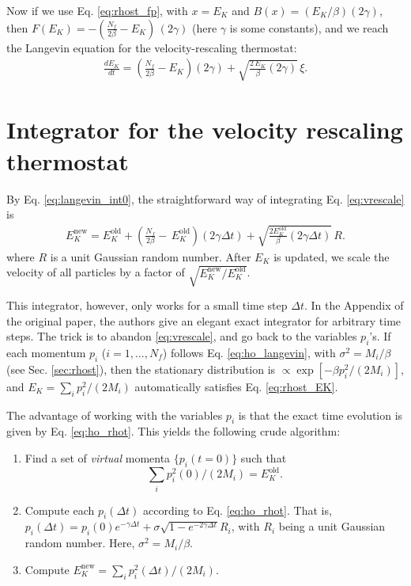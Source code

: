 \documentclass[11pt]{article}
\begin{document}
Now if we use Eq. \eqref{eq:rhost_fp},
with $x = E_K$ and $B(x) = (E_K/\beta) (2 \gamma)$,
then $F(E_K) = -\left(\frac { N_f } { 2 \beta } - E_K\right) \, (2 \gamma)$
(here $\gamma$ is some constants),
and we reach the Langevin equation
for the velocity-rescaling thermostat:
\begin{align}
\frac { d E_K } { d t }
=
  \left( \frac{ N_f }{ 2 \beta } - E_K \right)
  (2 \gamma)
+ \sqrt{ \frac{ 2 \, E_K } { \beta } ( 2 \gamma ) } \, \xi.
\label{eq:vrescale}
\end{align}




\section{Integrator for the velocity rescaling thermostat}



By Eq. \eqref{eq:langevin_int0},
the straightforward way of integrating Eq. \eqref{eq:vrescale} is
\begin{align}
E_K^\mathrm{new}
=
E_K^\mathrm{old}
+ \left( \frac{ N_f }{ 2 \beta } - \, E_K^\mathrm{old} \right)
  (2 \gamma \Delta t)
  + \sqrt{ \frac{ 2 E_K^\mathrm{old} } { \beta } (2 \gamma \Delta t) } \, R.
\label{eq:vrescale_int0}
\end{align}
%
where $R$ is a unit Gaussian random number.
After $E_K$ is updated,
we scale the velocity of all particles by a factor of
$\sqrt{ E_K^\mathrm{new} / E_K^\mathrm{old} }$.


This integrator, however,
only works for a small time step $\Delta t$.
%
In the Appendix of the original paper\cite{bdp2007},
the authors give an elegant exact integrator
for arbitrary time steps.
%
The trick is
to abandon \eqref{eq:vrescale},
and go back to the variables $p_i$'s.
%
If each momentum $p_i$ ($i = 1, \dots, N_f$) follows Eq. \eqref{eq:ho_langevin},
with $\sigma^2 = M_i/\beta$ (see Sec. \ref{sec:rhost}),
then the stationary distribution is
$\propto \exp[-\beta p_i^2/(2 M_i)]$,
and $E_K = \sum_i p_i^2 /(2 M_i)$
automatically satisfies Eq. \eqref{eq:rhost_EK}.

The advantage of working with the variables $p_i$
is that the exact time evolution
is given by Eq. \eqref{eq:ho_rhot}.
%
This yields the following crude algorithm:
%
\begin{enumerate}
  \item
    Find a set of \emph{virtual} momenta $\{ p_i(t = 0) \}$ such that
    \begin{equation}
      \sum_i p_i^2(0)/(2 M_i) = E_K^\mathrm{old}.
      \label{eq:sumEKold}
    \end{equation}

  \item
    Compute each $p_i(\Delta t)$ according to Eq. \eqref{eq:ho_rhot}.
    That is,
    $p_i(\Delta t) = p_i(0) e^{-\gamma \Delta t}
    + \sigma \sqrt{1 - e^{-2\gamma \Delta t}} R_i$,
    with $R_i$ being a unit Gaussian random number.
    Here, $\sigma^2 = M_i/\beta$.

  \item
    Compute
    $E_K^\mathrm{new}
    =
    \sum_i p_i^2(\Delta t)/(2 M_i)$.
\end{enumerate}
\end{document}
